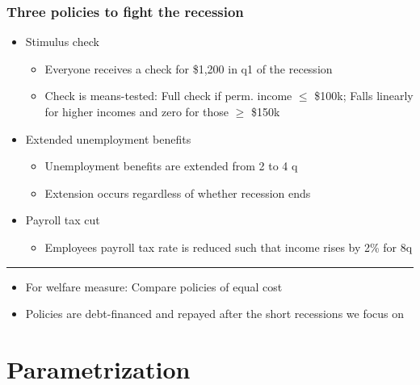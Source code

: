\documentclass[pdflatex,aspectratio=169]{beamer}
\begin{document}
\begin{frame}
\frametitle{Three policies to fight the recession}

	\begin{itemize}
	\itemsep =.5\bigskipamount
	\item Stimulus check
	\begin{itemize}
		\itemsep = .25\bigskipamount 
		\item Everyone receives a check for \$1,200 in q1 of the recession
		\item Check is means-tested: Full check if perm. income $\leq$ \$100k; Falls linearly for higher incomes and zero for those $\geq$ \$150k
	\end{itemize}

	\item Extended unemployment benefits
	\begin{itemize}
		\itemsep = .25\bigskipamount 
		\item Unemployment benefits are extended from 2 to 4 q
		\item Extension occurs regardless of whether recession ends
	\end{itemize}

	\item Payroll tax cut
	\begin{itemize}
		\item Employees payroll tax rate is reduced such that income rises by 2\% for 8q	
	\end{itemize}
\end{itemize}
\medskip
\hrule \medskip
\begin{itemize}
	\itemsep = .5\bigskipamount
	\item For welfare measure: Compare policies of equal cost
	\item Policies are debt-financed and repayed after the short recessions we focus on
\end{itemize}
\end{frame}

\section{Parametrization}
\end{document}

